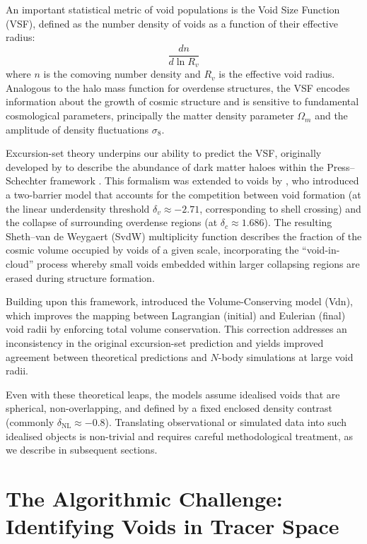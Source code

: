 \documentclass[12pt]{report}
\begin{document}
An important statistical metric of void populations is the Void Size Function (VSF), defined as the number density of voids as a function of their effective radius:
\begin{equation}
    \frac{dn}{d\ln R_v}
    \label{eq:vsf_definition}
\end{equation}
where $n$ is the comoving number density and $R_v$ is the effective void radius. Analogous to the halo mass function for overdense structures, the VSF encodes information about the growth of cosmic structure and is sensitive to fundamental cosmological parameters, principally the matter density parameter $\Omega_m$ and the amplitude of density fluctuations $\sigma_8$.

Excursion-set theory underpins our ability to predict the VSF, originally developed by \citet{Bond1991} to describe the abundance of dark matter haloes within the Press--Schechter framework \citep{PressSchechter1974}. This formalism was extended to voids by \citet{Sheth2004}, who introduced a two-barrier model that accounts for the competition between void formation (at the linear underdensity threshold $\delta_v \approx -2.71$, corresponding to shell crossing) and the collapse of surrounding overdense regions (at $\delta_c \approx 1.686$). The resulting Sheth--van de Weygaert (SvdW) multiplicity function describes the fraction of the cosmic volume occupied by voids of a given scale, incorporating the ``void-in-cloud'' process whereby small voids embedded within larger collapsing regions are erased during structure formation.

Building upon this framework, \citet{Jennings2013} introduced the Volume-Conserving model (Vdn), which improves the mapping between Lagrangian (initial) and Eulerian (final) void radii by enforcing total volume conservation. This correction addresses an inconsistency in the original excursion-set prediction and yields improved agreement between theoretical predictions and $N$-body simulations at large void radii.

Even with these theoretical leaps, the models assume idealised voids that are spherical, non-overlapping, and defined by a fixed enclosed density contrast (commonly $\delta_\mathrm{NL} \approx -0.8$). Translating observational or simulated data into such idealised objects is non-trivial and requires careful methodological treatment, as we describe in subsequent sections.


\section{The Algorithmic Challenge: Identifying Voids in Tracer Space}
\end{document}
